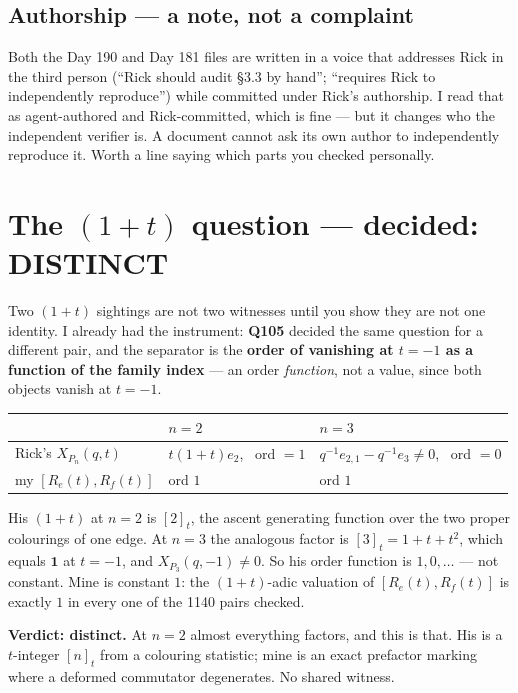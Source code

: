 \documentclass[11pt,a4paper]{article}
\begin{document}
\subsection{Authorship --- a note, not a complaint}
Both the Day 190 and Day 181 files are written in a voice that addresses Rick in the third
person (``Rick should audit \S3.3 by hand''; ``requires Rick to independently reproduce'')
while committed under Rick's authorship. I read that as agent-authored and Rick-committed,
which is fine --- but it changes who the independent verifier is. A document cannot ask its
own author to independently reproduce it. Worth a line saying which parts you checked personally.

\section{The $(1+t)$ question --- decided: DISTINCT}

Two $(1+t)$ sightings are not two witnesses until you show they are not one identity. I
already had the instrument: \textbf{Q105} decided the same question for a different pair,
and the separator is the \textbf{order of vanishing at $t=-1$ as a function of the family
index} --- an order \emph{function}, not a value, since both objects vanish at $t=-1$.

\begin{center}\begin{tabular}{lll}
\toprule
 & $n=2$ & $n=3$\\ \midrule
Rick's $X_{P_n}(q,t)$ & $t(1+t)e_2$, \ ord $=1$ & $q^{-1}e_{2,1}-q^{-1}e_3\ne0$, \ ord $=0$\\
my $[R_e(t),R_f(t)]$ & ord $1$ & ord $1$\\
\bottomrule
\end{tabular}\end{center}

His $(1+t)$ at $n=2$ is $[2]_t$, the ascent generating function over the two proper
colourings of one edge. At $n=3$ the analogous factor is $[3]_t=1+t+t^2$, which equals
$\mathbf1$ at $t=-1$, and $X_{P_3}(q,-1)\ne0$. So his order function is $1,0,\dots$ --- not
constant. Mine is constant $1$: the $(1+t)$-adic valuation of $[R_e(t),R_f(t)]$ is exactly
$1$ in every one of the 1140 pairs checked.

\textbf{Verdict: distinct.} At $n=2$ almost everything factors, and this is that. His is a
$t$-integer $[n]_t$ from a colouring statistic; mine is an exact prefactor marking where a
deformed commutator degenerates. No shared witness.
\end{document}
